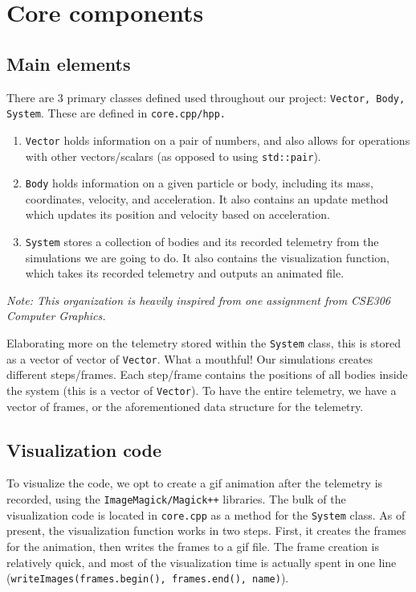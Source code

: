 \documentclass{article}
\begin{document}
\section{Core components}

\subsection{Main elements}

There are 3 primary classes defined used throughout our project: \texttt{Vector, Body, System}. These are defined in \texttt{core.cpp/hpp.}
\begin{enumerate}
    \item \texttt{Vector} holds information on a pair of numbers, and also allows for operations with other vectors/scalars (as opposed to using \texttt{std::pair}).
    \item \texttt{Body} holds information on a given particle or body, including its mass, coordinates, velocity, and acceleration. It also contains an update method which updates its position and velocity based on acceleration. 
    \item \texttt{System} stores a collection of bodies and its recorded telemetry from the simulations we are going to do. It also contains the visualization function, which takes its recorded telemetry and outputs an animated file.
\end{enumerate} 
\textit{Note: This organization is heavily inspired from one assignment from CSE306 Computer Graphics.}

Elaborating more on the telemetry stored within the \texttt{System} class, this is stored as a vector of vector of \texttt{Vector}. What a mouthful! Our simulations creates different steps/frames. Each step/frame contains the positions of all bodies inside the system (this is a vector of \texttt{Vector}). To have the entire telemetry, we have a vector of frames, or the aforementioned data structure for the telemetry.

\subsection{Visualization code}

To visualize the code, we opt to create a gif animation after the telemetry is recorded, using the \texttt{ImageMagick/Magick++} libraries. The bulk of the visualization code is located in \texttt{core.cpp} as a method for the \texttt{System} class. As of present, the visualization function works in two steps. First, it creates the frames for the animation, then writes the frames to a gif file. The frame creation is relatively quick, and most of the visualization time is actually spent in one line (\texttt{writeImages(frames.begin(), frames.end(), name)}). 
\end{document}
